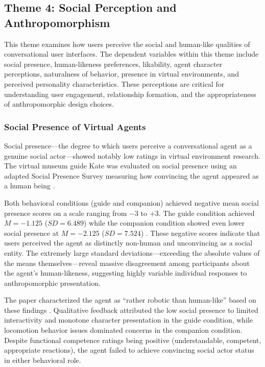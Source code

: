 \documentclass[manuscript,anonymous,sigconf]{acmart}
\begin{document}
\subsection{Theme 4: Social Perception and Anthropomorphism}

This theme examines how users perceive the social and human-like qualities of conversational user interfaces. The dependent variables within this theme include social presence, human-likeness preferences, likability, agent character perceptions, naturalness of behavior, presence in virtual environments, and perceived personality characteristics. These perceptions are critical for understanding user engagement, relationship formation, and the appropriateness of anthropomorphic design choices.

\subsubsection{Social Presence of Virtual Agents}

Social presence---the degree to which users perceive a conversational agent as a genuine social actor---showed notably low ratings in virtual environment research. The virtual museum guide Kate was evaluated on social presence using an adapted Social Presence Survey measuring how convincing the agent appeared as a human being \cite{A82}.

Both behavioral conditions (guide and companion) achieved negative mean social presence scores on a scale ranging from $-3$ to $+3$. The guide condition achieved $M = -1.125$ ($SD = 6.489$) while the companion condition showed even lower social presence at $M = -2.125$ ($SD = 7.524$) \cite{A82}. These negative scores indicate that users perceived the agent as distinctly non-human and unconvincing as a social entity. The extremely large standard deviations---exceeding the absolute values of the means themselves---reveal massive disagreement among participants about the agent's human-likeness, suggesting highly variable individual responses to anthropomorphic presentation.

The paper characterized the agent as ``rather robotic than human-like'' based on these findings \cite{A82}. Qualitative feedback attributed the low social presence to limited interactivity and monotone character presentation in the guide condition, while locomotion behavior issues dominated concerns in the companion condition. Despite functional competence ratings being positive (understandable, competent, appropriate reactions), the agent failed to achieve convincing social actor status in either behavioral role.
\end{document}
